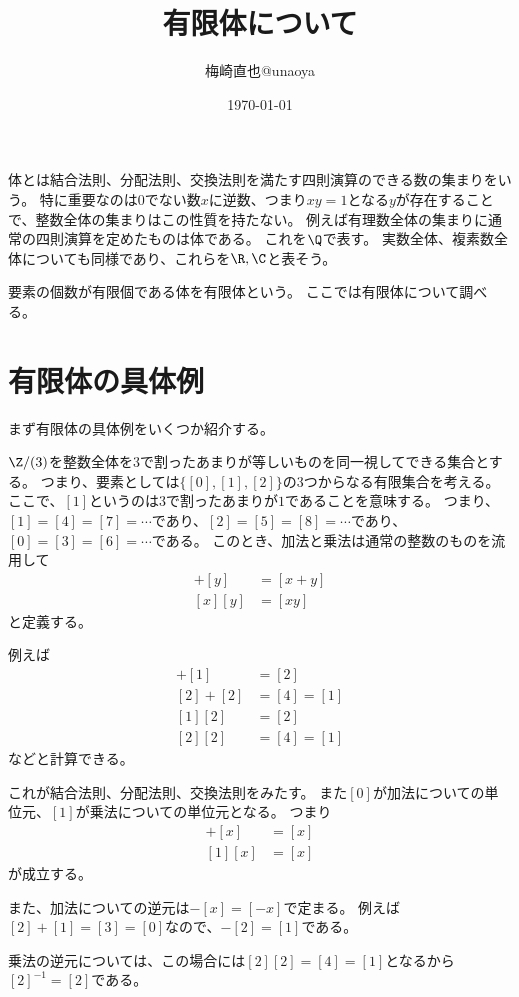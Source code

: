 \documentclass[uplatex]{jsarticle}
\title{有限体について}
\author{梅崎直也@unaoya}
\date{\today}
\begin{document}
\maketitle

体とは結合法則、分配法則、交換法則を満たす四則演算のできる数の集まりをいう。
特に重要なのは$0$でない数$x$に逆数、つまり$xy=1$となる$y$が存在することで、整数全体の集まりはこの性質を持たない。
例えば有理数全体の集まりに通常の四則演算を定めたものは体である。
これを$\Q$で表す。
実数全体、複素数全体についても同様であり、これらを$\R, \C$と表そう。

要素の個数が有限個である体を有限体という。
ここでは有限体について調べる。

\section{有限体の具体例}
まず有限体の具体例をいくつか紹介する。

\begin{eg}
  $\Z/(3)$を整数全体を$3$で割ったあまりが等しいものを同一視してできる集合とする。
  つまり、要素としては$\{[0],[1],[2]\}$の$3$つからなる有限集合を考える。
  ここで、$[1]$というのは$3$で割ったあまりが$1$であることを意味する。
  つまり、$[1]=[4]=[7]=\cdots$であり、$[2]=[5]=[8]=\cdots$であり、$[0]=[3]=[6]=\cdots$である。
  このとき、加法と乗法は通常の整数のものを流用して
  \begin{align*}
    [x]+[y]&=[x+y]\\
    [x][y]&=[xy]
  \end{align*}
  と定義する。

  例えば
  \begin{align*}
    [1]+[1]&=[2]\\
    [2]+[2]&=[4]=[1]\\
    [1][2]&=[2]\\
    [2][2]&=[4]=[1]
  \end{align*}
  などと計算できる。
  
  これが結合法則、分配法則、交換法則をみたす。
  また$[0]$が加法についての単位元、$[1]$が乗法についての単位元となる。
  つまり
  \begin{align*}
    [0]+[x]&=[x]\\
    [1][x]&=[x]
  \end{align*}
  が成立する。

  また、加法についての逆元は$-[x]=[-x]$で定まる。
  例えば$[2]+[1]=[3]=[0]$なので、$-[2]=[1]$である。

  乗法の逆元については、この場合には$[2][2]=[4]=[1]$となるから$[2]^{-1}=[2]$である。
\end{eg}
\end{document}
